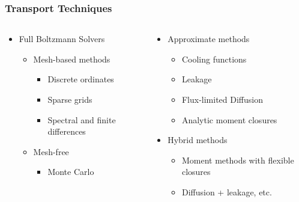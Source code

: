 \documentclass[]{beamer}
\begin{document}
\begin{frame}
  \frametitle{Transport Techniques}
  \begin{columns}
    \begin{column}{6cm}
      \begin{itemize}
      \item Full Boltzmann Solvers
        \begin{itemize}
        \item Mesh-based methods
          \begin{itemize}
          \item Discrete ordinates
          \item Sparse grids
          \item Spectral and finite differences
          \end{itemize}
        \item Mesh-free
          \begin{itemize}
          \item Monte Carlo
          \end{itemize}
        \end{itemize}
      \end{itemize}
    \end{column}
    \begin{column}{6cm}
      \begin{itemize}
      \item Approximate methods
        \begin{itemize}
        \item Cooling functions
        \item Leakage
        \item Flux-limited Diffusion
        \item Analytic moment closures
        \end{itemize}
      \item Hybrid methods
        \begin{itemize}
        \item Moment methods with flexible closures
        \item Diffusion + leakage, etc.
        \end{itemize}
      \end{itemize}
    \end{column}
  \end{columns}
\end{frame}
\end{document}
